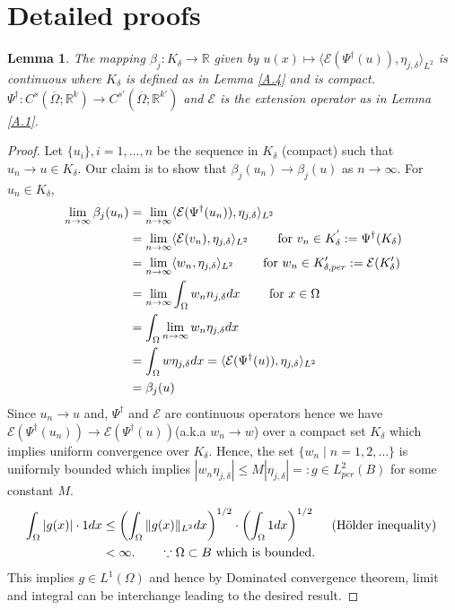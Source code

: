 \documentclass[reqno]{amsart}
\theoremstyle{plain}
\newtheorem{lem}{Lemma}
\theoremstyle{definition}
\newcommand{\bb}[1]{\mathbb{#1}}
\newcommand{\cal}[1]{\mathcal{#1}}
\begin{document}
\section{Detailed proofs} \label{appendix:A}
\begin{lem}
    The mapping $\beta_j : K_\delta \to \bb R$ given by $u(x) \mapsto \langle\cal E(\Psi^\dag(u)),\eta_{j,\delta}\rangle_{L^2}$ is continuous where $K_\delta$ is defined as in Lemma \ref{A.4} and is compact. $\Psi^\dag : C^s(\overline{\Omega};\bb R^k) \to C^{s'}(\overline{\Omega};\bb R^{k'})$ and $\cal E$ is the extension operator as in Lemma \ref{A.1}.
\end{lem}
\begin{proof}
    Let  $\{u_i\}, i = 1, \dots, n$ be the sequence in $K_\delta$ (compact) such that $u_n \to u \in K_\delta.$ Our claim is to show that $\beta_j(u_n) \to \beta_j(u)$ as $n \to \infty$. For $u_n \in K_\delta$,
    $$
    \begin{aligned}
        \lim_{n\to \infty}\beta_j(u_n) &= \lim_{n\to \infty} \langle\cal E(\Psi^\dag(u_n)),\eta_{j,\delta}\rangle_{L^2} \\
        &= \lim_{n \to \infty}\langle\cal E(v_n),\eta_{j,\delta}\rangle_{L^2} \text{ \qquad for } v_n \in K^{'}_\delta:= \Psi^\dag(K_\delta) \\
        &= \lim_{n \to \infty} \langle w_n, \eta_{j,\delta}\rangle_{L^2} \text{ \qquad for }w_n \in K'_{\delta, per}:= \cal E(K'_\delta) \\
        &= \lim_{n \to \infty}\int_\Omega w_n n_{j,\delta} dx \text{ \qquad for } x \in \Omega\\
        &=\int_\Omega \lim_{n \to \infty} w_n\eta_{j,\delta} dx \\
        &= \int_\Omega w\eta_{j,\delta} dx = \langle\cal E(\Psi^\dag(u)),\eta_{j,\delta}\rangle_{L^2} \\
        &= \beta_j(u)
    \end{aligned}
    $$
    Since $u_n \to u$ and, $\Psi^\dag$ and $\cal E$ are continuous operators hence we have $\cal E(\Psi^\dag(u_n)) \to \cal E(\Psi^\dag(u))$(a.k.a $w_n \to w$) over a compact set $K_\delta$ which implies uniform convergence over $K_\delta$. Hence, the set $\{w_n \mid n = 1,2,\dots\}$ is uniformly bounded which implies $|w_n\eta_{j,\delta}| \leq M |\eta_{j,\delta}| =: g \in L^2_{per}(B)$ for some constant $M$.
    $$
    \begin{aligned}
        \int_\Omega |g(x)|\cdot 1 dx &\leq \left(\int_{\Omega}\|g(x)\|_{L^2} dx \right)^{1/2}\cdot \left(\int_{\Omega} 1 dx\right)^{1/2}\text{ \quad (H\"{o}lder inequality) }\\
        &< \infty. \qquad \because \Omega \subset B \text{ which is bounded. }
    \end{aligned}
    $$
    This implies $g \in L^1(\Omega)$ and hence by Dominated convergence theorem, limit and integral can be interchange leading to the desired result. 
\end{proof}


\end{document}
